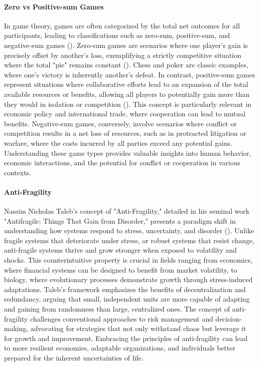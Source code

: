 \documentclass{article}
\begin{document}
\paragraph{Zero vs Positive-sum Games}
In game theory, games are often categorized by the total net outcomes for all participants, leading to classifications such as zero-sum, positive-sum, and negative-sum games (\cite{gameTheoryText}). Zero-sum games are scenarios where one player's gain is precisely offset by another's loss, exemplifying a strictly competitive situation where the total "pie" remains constant (\cite{schelling}). Chess and poker are classic examples, where one's victory is inherently another's defeat. In contrast, positive-sum games represent situations where collaborative efforts lead to an expansion of the total available resources or benefits, allowing all players to potentially gain more than they would in isolation or competition (\cite{axelrod}). This concept is particularly relevant in economic policy and international trade, where cooperation can lead to mutual benefits. Negative-sum games, conversely, involve scenarios where conflict or competition results in a net loss of resources, such as in protracted litigation or warfare, where the costs incurred by all parties exceed any potential gains. Understanding these game types provides valuable insights into human behavior, economic interactions, and the potential for conflict or cooperation in various contexts.

\paragraph{Anti-Fragility}
Nassim Nicholas Taleb's concept of "Anti-Fragility," detailed in his seminal work "Antifragile: Things That Gain from Disorder," presents a paradigm shift in understanding how systems respond to stress, uncertainty, and disorder (\cite{taleb2012antifragile}). Unlike fragile systems that deteriorate under stress, or robust systems that resist change, anti-fragile systems thrive and grow stronger when exposed to volatility and shocks. This counterintuitive property is crucial in fields ranging from economics, where financial systems can be designed to benefit from market volatility, to biology, where evolutionary processes demonstrate growth through stress-induced adaptations. Taleb's framework emphasizes the benefits of decentralization and redundancy, arguing that small, independent units are more capable of adapting and gaining from randomness than large, centralized ones. The concept of anti-fragility challenges conventional approaches to risk management and decision-making, advocating for strategies that not only withstand chaos but leverage it for growth and improvement. Embracing the principles of anti-fragility can lead to more resilient economies, adaptable organizations, and individuals better prepared for the inherent uncertainties of life.
\end{document}
